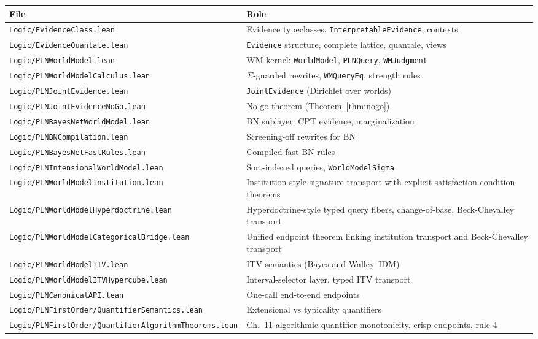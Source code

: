 \documentclass[]{article}
\newcommand{\code}[1]{\texttt{#1}}
\begin{document}
\begin{longtable}{p{}p{}}
\hline
\textbf{File} & \textbf{Role} \\ \hline
\endhead
\code{Logic/EvidenceClass.lean} & Evidence typeclasses,
  \code{InterpretableEvidence}, contexts \\
\code{Logic/EvidenceQuantale.lean} & \code{Evidence} structure, complete
  lattice, quantale, views \\
\code{Logic/PLNWorldModel.lean} & WM kernel: \code{WorldModel},
  \code{PLNQuery}, \code{WMJudgment} \\
\code{Logic/PLNWorldModelCalculus.lean} & $\Sigma$-guarded rewrites,
  \code{WMQueryEq}, strength rules \\
\code{Logic/PLNJointEvidence.lean} & \code{JointEvidence} (Dirichlet over
  worlds) \\
\code{Logic/PLNJointEvidenceNoGo.lean} & No-go theorem
  (Theorem~\ref{thm:nogo}) \\
\code{Logic/PLNBayesNetWorldModel.lean} & BN sublayer: CPT evidence,
  marginalization \\
\code{Logic/PLNBNCompilation.lean} & Screening-off rewrites for BN \\
\code{Logic/PLNBayesNetFastRules.lean} & Compiled fast BN rules \\
\code{Logic/PLNIntensionalWorldModel.lean} & Sort-indexed queries,
  \code{WorldModelSigma} \\
\code{Logic/PLNWorldModelInstitution.lean} & Institution-style signature
  transport with explicit satisfaction-condition theorems \\
\code{Logic/PLNWorldModelHyperdoctrine.lean} & Hyperdoctrine-style typed
  query fibers, change-of-base, Beck-Chevalley transport \\
\code{Logic/PLNWorldModelCategoricalBridge.lean} & Unified endpoint
  theorem linking institution transport and Beck-Chevalley transport \\
\code{Logic/PLNWorldModelITV.lean} & ITV semantics (Bayes and
  Walley~IDM) \\
\code{Logic/PLNWorldModelITVHypercube.lean} & Interval-selector layer,
  typed ITV transport \\
\code{Logic/PLNCanonicalAPI.lean} & One-call end-to-end endpoints \\
\code{Logic/PLNFirstOrder/QuantifierSemantics.lean} & Extensional vs
  typicality quantifiers \\
\code{Logic/PLNFirstOrder/QuantifierAlgorithmTheorems.lean} &
  Ch.~11 algorithmic quantifier monotonicity, crisp endpoints, rule-4

\end{longtable}
\end{document}
